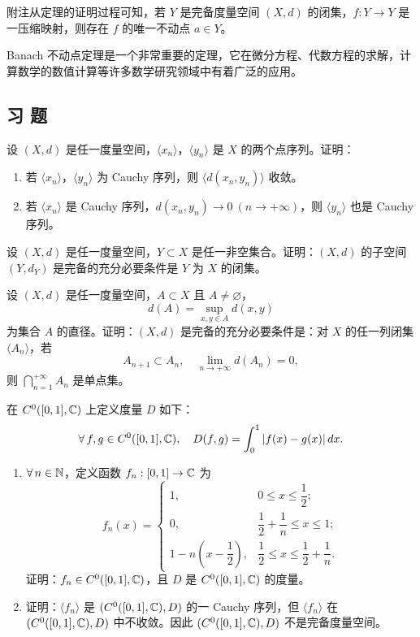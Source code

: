 附注\quad 从定理的证明过程可知，若 $Y$ 是完备度量空间 $(X,d)$ 的闭集，$f:Y\to Y$ 是一压缩映射，则存在 $f$ 的唯一不动点 $a\in Y$。

Banach 不动点定理是一个非常重要的定理，它在微分方程、代数方程的求解，计算数学的数值计算等许多数学研究领域中有着广泛的应用。

\subsection*{习 题}

\begin{exercise}
	\item 设 $(X,d)$ 是任一度量空间，$\langle x_n\rangle$，$\langle y_n\rangle$ 是 $X$ 的两个点序列。证明：
	\begin{enumerate}[label=\arabic*)]
		\item 若 $\langle x_n\rangle$，$\langle y_n\rangle$ 为 Cauchy 序列，则 $\langle d(x_n,y_n)\rangle$ 收敛。
		\item 若 $\langle x_n\rangle$ 是 Cauchy 序列，$d(x_n,y_n)\to0\ (n\to+\infty)$，则 $\langle y_n\rangle$ 也是 Cauchy 序列。
	\end{enumerate}
\end{exercise}

\begin{exercise}
	\item 设 $(X,d)$ 是任一度量空间，$Y\subset X$ 是任一非空集合。证明：$(X,d)$ 的子空间 $(Y,d_Y)$ 是完备的充分必要条件是 $Y$ 为 $X$ 的闭集。
\end{exercise}

\begin{exercise}
	\item 设 $(X,d)$ 是任一度量空间，$A\subset X$ 且 $A\neq\varnothing$，
	\[d(A)=\sup_{x,y\in A}d(x,y)\]
	为集合 $A$ 的直径。证明：$(X,d)$ 是完备的充分必要条件是：对 $X$ 的任一列闭集 $\langle A_n\rangle$，若
	\[A_{n+1}\subset A_n,\quad\lim_{n\to+\infty}d(A_n)=0,\]
	则 $\displaystyle\bigcap_{n=1}^{+\infty}A_n$ 是单点集。
\end{exercise}

\begin{exercise}
	\item 在 $C^0([0,1],\mathbb{C})$ 上定义度量 $D$ 如下：
	\[\forall\,f,g\in C^0([0,1],\mathbb{C}),\quad D(f,g)=\int_0^1|f(x)-g(x)|\,dx.\]
	\begin{enumerate}[label=\arabic*)]
		\item $\forall\,n\in\mathbb{N}$，定义函数 $f_n:[0,1]\to\mathbb{C}$ 为
		\[f_n(x)=\begin{cases} 1, & 0\leqslant x\leqslant\dfrac{1}{2};\\[1ex] 0, & \dfrac{1}{2}+\dfrac{1}{n}\leqslant x\leqslant1;\\[1ex] 1-n\left(x-\dfrac{1}{2}\right), & \dfrac{1}{2}\leqslant x\leqslant\dfrac{1}{2}+\dfrac{1}{n}. \end{cases}\]
		证明：$f_n\in C^0([0,1],\mathbb{C})$，且 $D$ 是 $C^0([0,1],\mathbb{C})$ 的度量。
		\item 证明：$\langle f_n\rangle$ 是 $(C^0([0,1],\mathbb{C}),D)$ 的一 Cauchy 序列，但 $\langle f_n\rangle$ 在 $(C^0([0,1],\mathbb{C}),D)$ 中不收敛。因此 $(C^0([0,1],\mathbb{C}),D)$ 不是完备度量空间。
	\end{enumerate}
\end{exercise}

